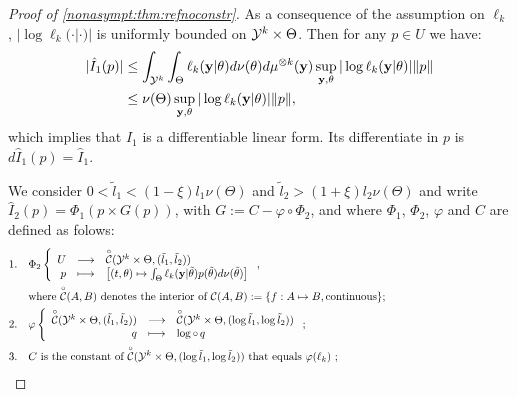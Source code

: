 \begin{proof}[Proof of \cref{nonasympt:thm:refnoconstr}]
As a consequence of the assumption on $\ell_k$, $|\log \ell_k(\cdot|\cdot)|$ is uniformly bounded on $\mathcal{Y}^k\times\Theta$. Then for any $p\in U$ we have:
    \begin{align}\label{eq:I1differ}
        |\hat I_1(p)| &\leq \int_{\mathcal{Y}^k}\int_\Theta \ell_k(\mathbf{y}|\theta)d\nu(\theta)d\mu^{\otimes k}(\mathbf{y}) \sup_{\mathbf{y},\theta}|\log \ell_k(\mathbf{y}|\theta)|\|p\|\\
            &\leq \nu(\Theta)\sup_{\mathbf{y},\theta}|\log \ell_k(\mathbf{y}|\theta)|\|p\| \nonumber,
    \end{align}
which implies that $\hat I_1$ is a differentiable linear form. Its differentiate in $p$ is $d\hat I_1(p)=\hat I_1$.

We consider $0<\tilde l_1<(1-\xi)l_1\nu(\Theta)$ and $\tilde l_2>(1+\xi)l_2\nu(\Theta)$ and write $\hat I_2(p) = \Phi_1(p\times G(p))$, with $G := C - \varphi\circ\Phi_2$, and where $\Phi_1$, $\Phi_2$, $\varphi$ and $C$ are defined as folows:
    \begin{equation*}
        \begin{aligned}
            \text{1.}\quad& \Phi_2\left\{\begin{array}{rcl}
                U&\longrightarrow&\overset{\circ}{\cC}({\cY^k}\times\Theta,(\tilde l_1,\tilde  l_2)) \\
                p&\longmapsto&\left[(t,\theta)\mapsto\int_\Theta \ell_k(\mbf y|\tilde\theta)p(\tilde\theta)d\nu(\tilde\theta)\right]
            \end{array}\right. ,\\
            &
            \text{where $\overset\circ{\cC}(A,B)$ denotes the interior of $\cC(A,B):=\{f:A\mapsto B,\,$continuous$\}$;\hspace*{4cm}}\\ %
            \text{2.}\quad& \varphi\left\{\begin{array}{rcl}
                \overset{\circ}{\cC}({\cY^k}\times\Theta,(\tilde l_1,\tilde  l_2))&\longrightarrow&\overset{\circ}{\cC}({\cY^k}\times\Theta,(\log\tilde l_1,\log\tilde  l_2))\\
                q&\longmapsto& \log\circ\, q
            \end{array}\right. ;\\
            \text{3.}\quad& C\text{\ is the constant of  $\overset{\circ}{\cC}({\cY^k}\times\Theta,(\log\tilde l_1,\log\tilde  l_2))$ that equals $\varphi(\ell_k)$ };\\

\end{aligned}
\end{equation*}
\end{proof}
